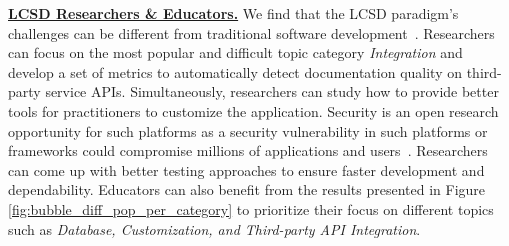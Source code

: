 \textbf{\ul{ LCSD Researchers \& Educators.}} We find that
the LCSD paradigm's challenges can be different from traditional software development~\cite{sahay2020supporting}. Researchers can focus on the most popular
and difficult topic category \textit{Integration} and
develop a set of metrics to automatically detect documentation quality on
third-party service APIs. Simultaneously, researchers can study how to
provide better tools for practitioners to customize the application.
Security is an open research opportunity for such platforms as a security
vulnerability in such platforms or frameworks could compromise millions of applications and users~\cite{lin2020software}. Researchers can come
up with better testing approaches to ensure faster development and dependability. Educators can also benefit from the results presented in Figure
\ref{fig:bubble_diff_pop_per_category} to prioritize their focus on different topics such as \textit{Database, Customization, and Third-party API Integration}.







